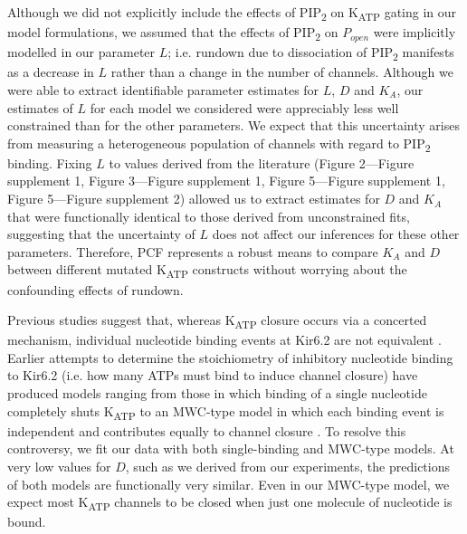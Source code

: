 \documentclass[9pt,lineno, onehalfspacing]{elife_modified}
\begin{document}
Although we did not explicitly include the effects of PIP\textsubscript{2} on K\textsubscript{ATP} gating in our model formulations, we assumed that the effects of PIP\textsubscript{2} on $P_{open}$ were implicitly modelled in our parameter $L$; i.e. rundown due to dissociation of PIP\textsubscript{2} manifests as a decrease in $L$ rather than a change in the number of channels.
Although we were able to extract identifiable parameter estimates for $L$, $D$ and $K_A$, our estimates of $L$ for each model we considered were appreciably less well constrained than for the other parameters.
We expect that this uncertainty arises from measuring a heterogeneous population of channels with regard to PIP\textsubscript{2} binding.
Fixing $L$ to values derived from the literature (Figure 2—Figure supplement 1, Figure 3—Figure supplement 1, Figure 5—Figure supplement 1, Figure 5—Figure supplement 2) allowed us to extract estimates for $D$ and $K_A$ that were functionally identical to those derived from unconstrained fits, suggesting that the uncertainty of $L$ does not affect our inferences for these other parameters.
Therefore, PCF represents a robust means to compare $K_A$ and $D$ between different mutated K\textsubscript{ATP} constructs without worrying about the confounding effects of rundown.

Previous studies suggest that, whereas K\textsubscript{ATP} closure occurs via a concerted mechanism, individual nucleotide binding events at Kir6.2 are not equivalent \citep{RN102}.
Earlier attempts to determine the stoichiometry of inhibitory nucleotide binding to Kir6.2 (i.e. how many ATPs must bind to induce channel closure) have produced models ranging from those in which binding of a single nucleotide completely shuts K\textsubscript{ATP} to an MWC-type model in which each binding event is independent and contributes equally to channel closure \citep{RN92, RN102, RN89, RN101, RN115, RN90, RN3}.
To resolve this controversy, we fit our data with both single-binding and MWC-type models.
At very low values for $D$, such as we derived from our experiments, the predictions of both models are functionally very similar.
Even in our MWC-type model, we expect most K\textsubscript{ATP} channels to be closed when just one molecule of nucleotide is bound.
\end{document}
